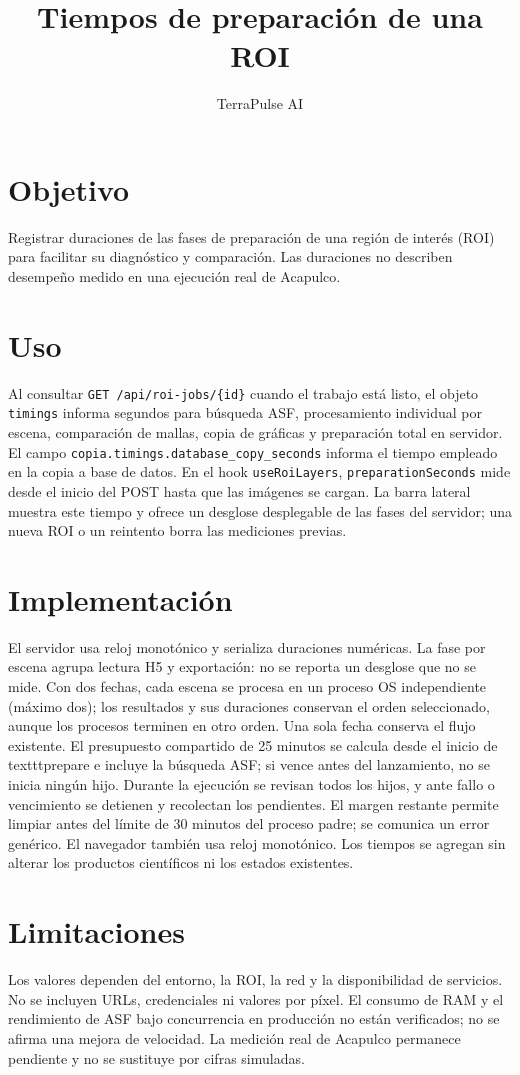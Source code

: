 \documentclass[12pt]{article}
\title{Tiempos de preparación de una ROI}
\author{TerraPulse AI}
\date{}
\begin{document}
\maketitle
\section{Objetivo}
Registrar duraciones de las fases de preparación de una región de interés (ROI) para facilitar su diagnóstico y comparación. Las duraciones no describen desempeño medido en una ejecución real de Acapulco.
\section{Uso}
Al consultar \texttt{GET /api/roi-jobs/\{id\}} cuando el trabajo está listo, el objeto \texttt{timings} informa segundos para búsqueda ASF, procesamiento individual por escena, comparación de mallas, copia de gráficas y preparación total en servidor. El campo \texttt{copia.timings.database\_copy\_seconds} informa el tiempo empleado en la copia a base de datos. En el hook \texttt{useRoiLayers}, \texttt{preparationSeconds} mide desde el inicio del POST hasta que las imágenes se cargan. La barra lateral muestra este tiempo y ofrece un desglose desplegable de las fases del servidor; una nueva ROI o un reintento borra las mediciones previas.
\section{Implementación}
El servidor usa reloj monotónico y serializa duraciones numéricas. La fase por escena agrupa lectura H5 y exportación: no se reporta un desglose que no se mide. Con dos fechas, cada escena se procesa en un proceso OS independiente (máximo dos); los resultados y sus duraciones conservan el orden seleccionado, aunque los procesos terminen en otro orden. Una sola fecha conserva el flujo existente. El presupuesto compartido de 25 minutos se calcula desde el inicio de \\texttt{prepare} e incluye la búsqueda ASF; si vence antes del lanzamiento, no se inicia ningún hijo. Durante la ejecución se revisan todos los hijos, y ante fallo o vencimiento se detienen y recolectan los pendientes. El margen restante permite limpiar antes del límite de 30 minutos del proceso padre; se comunica un error genérico. El navegador también usa reloj monotónico. Los tiempos se agregan sin alterar los productos científicos ni los estados existentes.
\section{Limitaciones}
Los valores dependen del entorno, la ROI, la red y la disponibilidad de servicios. No se incluyen URLs, credenciales ni valores por píxel. El consumo de RAM y el rendimiento de ASF bajo concurrencia en producción no están verificados; no se afirma una mejora de velocidad. La medición real de Acapulco permanece pendiente y no se sustituye por cifras simuladas.
\end{document}
